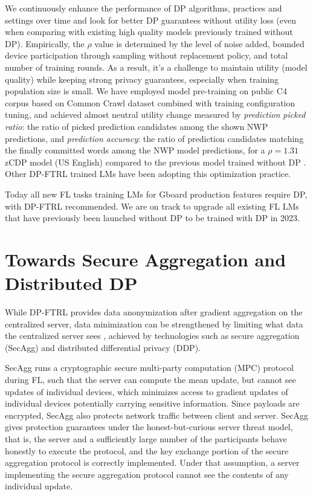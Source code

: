 \documentclass{article}
\begin{document}
We continuously enhance the performance of DP algorithms, practices and settings over time and look for better DP guarantees without utility loss (even when comparing with existing high quality models previously trained without DP). Empirically, the $\rho$ value is determined by the level of noise added, bounded device participation through sampling without replacement policy, and total number of training rounds. As a result, it's a challenge to maintain utility (model quality) while keeping strong privacy guarantees, especially when training population size is small. We have employed model pre-training on public C4 corpus based on Common Crawl dataset \cite{c4dataset} combined with training configuration tuning, and achieved almost neutral utility change measured by \textit{prediction picked ratio}: the ratio of picked prediction candidates among the shown NWP predictions, and \textit{prediction accuracy}: the ratio of prediction candidates matching the finally committed words among the NWP model predictions, for a $\rho=1.31$ zCDP model (US English) compared to the previous model trained without DP \cite{gboardlmdpftrl}. Other DP-FTRL trained LMs have been adopting this optimization practice.

Today all new FL tasks training LMs for Gboard production features require DP, with DP-FTRL recommended. We are on track to upgrade all existing FL LMs that have previously been launched without DP to be trained with DP in 2023.

\section{Towards Secure Aggregation and Distributed DP}

While DP-FTRL provides data anonymization after gradient aggregation on the centralized server, data minimization can be strengthened by limiting what data the centralized server sees \cite{flprivacy}, achieved by technologies such as secure aggregation (SecAgg) and distributed differential privacy (DDP).

SecAgg runs a cryptographic secure multi-party computation (MPC) protocol during FL, such that the server can compute the mean update, but cannot see updates of individual devices, which minimizes access to gradient updates of individual devices potentially carrying sensitive information. Since payloads are encrypted, SecAgg also protects network traffic between client and server. SecAgg gives protection guarantees under the honest-but-curious server threat model, that is, the server and a sufficiently large number of the participants behave honestly to execute the protocol, and the key exchange portion of the secure aggregation protocol is correctly implemented. Under that assumption, a server implementing the secure aggregation protocol cannot see the contents of any individual update.
\end{document}
